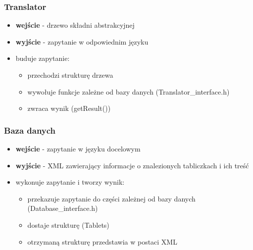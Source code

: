 \begin{frame}
\frametitle{Translator}
\begin{itemize}
\item \textbf{wejście} - drzewo składni abstrakcyjnej
\item \textbf{wyjście} - zapytanie w odpowiednim języku
\item buduje zapytanie:
\begin{itemize}
 \item przechodzi strukturę drzewa
 \item wywołuje funkcje zależne od bazy danych (Translator\_interface.h)
 \item zwraca wynik (getResult())
\end{itemize}
\end{itemize}
\end{frame}


\begin{frame}
     \frametitle{Baza danych}
\begin{itemize}
\item \textbf{wejście} - zapytanie w języku docelowym
\item \textbf{wyjście} - XML zawierający informacje o znalezionych tabliczkach i ich treść
\item wykonuje zapytanie i tworzy wynik:
\begin{itemize}
\item przekazuje zapytanie do części zależnej od bazy danych (Database\_interface.h)
\item dostaje strukturę (Tablets)
\item otrzymaną strukturę przedstawia w postaci XML
\end{itemize}
\end{itemize}
\end{frame}

